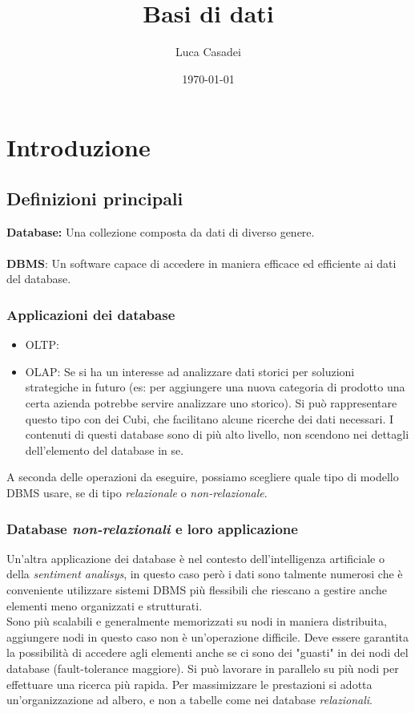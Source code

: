 \documentclass[a4paper,12pt]{report}
\title{Basi di dati}
\author{Luca Casadei}
\date{\today}
\begin{document}
	\maketitle
	\chapter{Introduzione}
	\section{Definizioni principali}
	\textbf{Database:} Una collezione composta da dati di diverso genere.\\\\
	\textbf{DBMS}: Un software capace di accedere in maniera efficace ed efficiente ai dati del database.\\
	\subsection*{Applicazioni dei database}
	\begin{itemize}
		\item OLTP:
		\item OLAP: Se si ha un interesse ad analizzare dati storici per soluzioni strategiche in futuro (es: per aggiungere una nuova categoria di prodotto una certa azienda potrebbe servire analizzare uno storico). Si può rappresentare questo tipo con dei Cubi, che facilitano alcune ricerche dei dati necessari. I contenuti di questi database sono di più alto livello, non scendono nei dettagli dell'elemento del database in se.
	\end{itemize}
A seconda delle operazioni da eseguire, possiamo scegliere quale tipo di modello DBMS usare, se di tipo \textit{relazionale} o \textit{non-relazionale}.
\subsection*{Database \textit{non-relazionali} e loro applicazione}
Un'altra applicazione dei database è nel contesto dell'intelligenza artificiale o della \textit{sentiment analisys}, in questo caso però i dati sono talmente numerosi che è conveniente utilizzare sistemi DBMS più flessibili che riescano a gestire anche elementi meno organizzati e strutturati.\\
Sono più scalabili e generalmente memorizzati su nodi in maniera distribuita, aggiungere nodi in questo caso non è un'operazione difficile.
Deve essere garantita la possibilità di accedere agli elementi anche se ci sono dei "guasti" in dei nodi del database (fault-tolerance maggiore). Si può lavorare in parallelo su più nodi per effettuare una ricerca più rapida. Per massimizzare le prestazioni si adotta un'organizzazione ad albero, e non a tabelle come nei database \textit{relazionali}.
\end{document}
